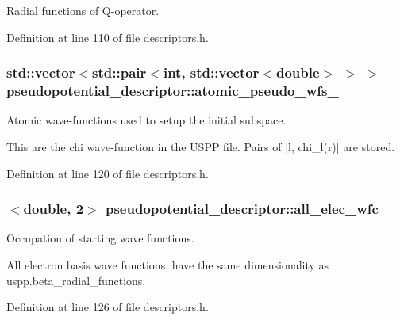 Radial functions of Q-\/operator. 



Definition at line 110 of file descriptors.\+h.

\hypertarget{structpseudopotential__descriptor_a6b1810865747a5458d1b0f4aab49193e}{}
\subsubsection[{atomic\+\_\+pseudo\+\_\+wfs\+\_\+}]{\setlength{\rightskip}{0pt plus 5cm}std\+::vector$<$std\+::pair$<$int, std\+::vector$<$double$>$ $>$ $>$ pseudopotential\+\_\+descriptor\+::atomic\+\_\+pseudo\+\_\+wfs\+\_\+}\label{structpseudopotential__descriptor_a6b1810865747a5458d1b0f4aab49193e}


Atomic wave-\/functions used to setup the initial subspace. 

This are the chi wave-\/function in the U\+S\+P\+P file. Pairs of \mbox{[}l, chi\+\_\+l(r)\mbox{]} are stored. 

Definition at line 120 of file descriptors.\+h.

\hypertarget{structpseudopotential__descriptor_abd17ce96ffb443283187144e61750776}{}
\subsubsection[{all\+\_\+elec\+\_\+wfc}]{$<$double, 2$>$ pseudopotential\+\_\+descriptor\+::all\+\_\+elec\+\_\+wfc}\label{structpseudopotential__descriptor_abd17ce96ffb443283187144e61750776}


Occupation of starting wave functions. 

All electron basis wave functions, have the same dimensionality as uspp.\+beta\+\_\+radial\+\_\+functions. 

Definition at line 126 of file descriptors.\+h.

\hypertarget{structpseudopotential__descriptor_a6a1450bee7e75c41ce208b83942e490e}{}
